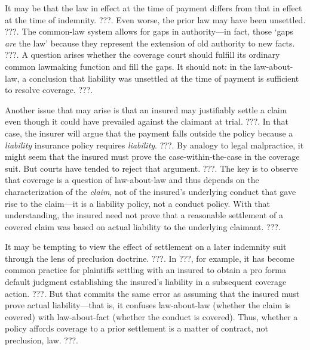\documentclass[
  12pt,
  letterpaper,
]{scrartcl}
\begin{document}
It may be that the law in effect at the time of payment differs from that in
effect at the time of indemnity. ???. Even worse, the prior law may have been
unsettled. ???. The common-law system allows for gaps in authority---in fact,
those `gaps \emph{are} the law' because they represent the extension of old
authority to new facts. ???. A question arises whether the coverage court
should fulfill its ordinary common lawmaking function and fill the gaps. It
should not: in the law-about-law, a conclusion that liability was unsettled at
the time of payment is sufficient to resolve coverage. ???.

Another issue that may arise is that an insured may justifiably settle a claim
even though it could have prevailed against the claimant at trial. ???. In that
case, the insurer will argue that the payment falls outside the policy
because a \emph{liability} insurance policy requires \emph{liability}. ???. By
analogy to legal malpractice, it might seem that the insured must prove the
case-within-the-case in the coverage suit. But courts have tended to reject
that argument. ???. The key is to observe that coverage is a question of
law-about-law and thus depends on the characterization of the \emph{claim}, not
of the insured's underlying conduct that gave rise to the claim---it is
a liability policy, not a conduct policy. With that understanding, the insured need not
prove that a reasonable settlement of a covered claim was based on actual
liability to the underlying claimant. ???.

It may be tempting to view the effect of settlement on a later indemnity suit
through the lens of preclusion doctrine. ???. In ???, for example, it has
become common practice for plaintiffs settling with an insured to obtain a pro
forma default judgment establishing the insured's liability in a subsequent
coverage action. ???. But that commits the same error as assuming that the
insured must prove actual liability---that is, it confuses law-about-law
(whether the claim is covered) with law-about-fact (whether the conduct is
covered). Thus, whether a policy affords coverage to a prior settlement is a
matter of contract, not preclusion, law. ???.
\end{document}
